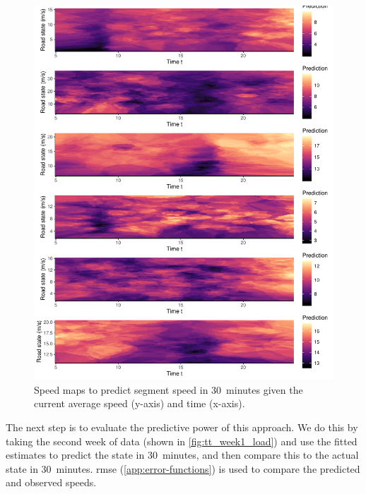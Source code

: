 \begin{knitrout}\small
{}\color{fgcolor}\begin{figure}

{\centering \includegraphics[width=\linewidth]{figure/tt_week0_grid-1} 

}

\caption[Speed maps to predict segment speed in 30~minutes given the current state]{Speed maps to predict segment speed in 30~minutes given the current average speed (y-axis) and time (x-axis).}\label{fig:tt_week0_grid}
\end{figure}


\end{knitrout}

The next step is to evaluate the predictive power of this approach. We do this by taking the second week of data (shown in \cref{fig:tt_week1_load}) and use the fitted estimates to predict the state in 30~minutes, and then compare this to the actual state in 30~minutes. \Gls{rmse} (\cref{app:error-functions}) is used to compare the predicted and observed speeds.



